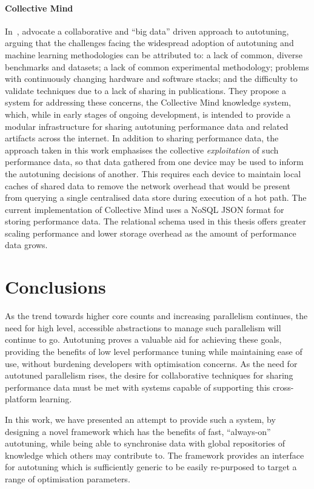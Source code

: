 \documentclass[nonatbib,preprint,9pt]{sigplanconf}
\begin{document}
\paragraph{Collective Mind} In~\cite{Saclay2010,Memon2013,Fursin2014},
\citeauthor{Fursin2014} advocate a collaborative and ``big data''
driven approach to autotuning, arguing that the challenges facing the
widespread adoption of autotuning and machine learning methodologies
can be attributed to: a lack of common, diverse benchmarks and
datasets; a lack of common experimental methodology; problems with
continuously changing hardware and software stacks; and the difficulty
to validate techniques due to a lack of sharing in publications. They
propose a system for addressing these concerns, the Collective Mind
knowledge system, which, while in early stages of ongoing development,
is intended to provide a modular infrastructure for sharing autotuning
performance data and related artifacts across the internet. In
addition to sharing performance data, the approach taken in this work
emphasises the collective \emph{exploitation} of such performance
data, so that data gathered from one device may be used to inform the
autotuning decisions of another. This requires each device to maintain
local caches of shared data to remove the network overhead that would
be present from querying a single centralised data store during
execution of a hot path. The current implementation of Collective Mind
uses a NoSQL JSON format for storing performance data. The relational
schema used in this thesis offers greater scaling performance and
lower storage overhead as the amount of performance data grows.


\section{Conclusions}\label{sec:conclusions}

As the trend towards higher core counts and increasing parallelism
continues, the need for high level, accessible abstractions to manage
such parallelism will continue to go. Autotuning proves a valuable aid
for achieving these goals, providing the benefits of low level
performance tuning while maintaining ease of use, without burdening
developers with optimisation concerns. As the need for autotuned
parallelism rises, the desire for collaborative techniques for sharing
performance data must be met with systems capable of supporting this
cross-platform learning.

In this work, we have presented an attempt to provide such a system,
by designing a novel framework which has the benefits of fast,
``always-on'' autotuning, while being able to synchronise data with
global repositories of knowledge which others may contribute to. The
framework provides an interface for autotuning which is sufficiently
generic to be easily re-purposed to target a range of optimisation
parameters.
\end{document}
